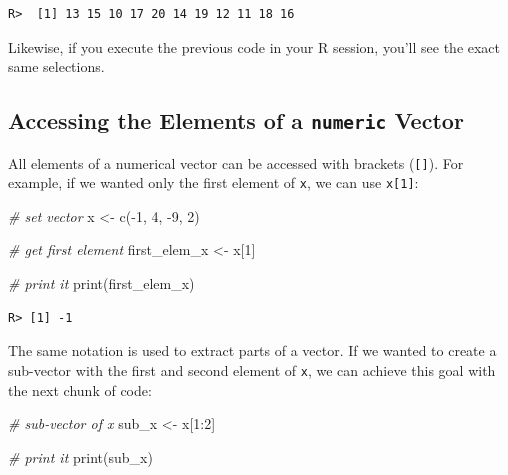 \documentclass[
  12pt,
]{book}
\newenvironment{Shaded}{\begin{snugshade}}{\end{snugshade}}
\newcommand{\CommentTok}[1]{\textcolor[rgb]{0.37,0.37,0.37}{\textit{#1}}}
\newcommand{\DecValTok}[1]{\textcolor[rgb]{0.06,0.06,0.06}{#1}}
\newcommand{\FunctionTok}[1]{\textcolor[rgb]{0,0,0}{#1}}
\newcommand{\NormalTok}[1]{#1}
\newcommand{\OtherTok}[1]{\textcolor[rgb]{0.37,0.37,0.37}{#1}}
\newcommand{\SpecialCharTok}[1]{\textcolor[rgb]{0,0,0}{#1}}
\begin{document}
\begin{verbatim}
R>  [1] 13 15 10 17 20 14 19 12 11 18 16
\end{verbatim}

Likewise, if you execute the previous code in your R session, you'll see the exact same selections.

\hypertarget{accessing-the-elements-of-a-numeric-vector}{%
\subsection{\texorpdfstring{Accessing the Elements of a \texttt{numeric} Vector}{Accessing the Elements of a numeric Vector}}\label{accessing-the-elements-of-a-numeric-vector}}

All elements of a numerical vector can be accessed with brackets (\texttt{{[}{]}}). For example, if we wanted only the first element of \texttt{x}, we can use \texttt{x{[}1{]}}:

\begin{Shaded}
\begin{Highlighting}[]
\CommentTok{\# set vector}
\NormalTok{x }\OtherTok{\textless{}{-}} \FunctionTok{c}\NormalTok{(}\SpecialCharTok{{-}}\DecValTok{1}\NormalTok{, }\DecValTok{4}\NormalTok{, }\SpecialCharTok{{-}}\DecValTok{9}\NormalTok{, }\DecValTok{2}\NormalTok{)}

\CommentTok{\# get first element}
\NormalTok{first\_elem\_x }\OtherTok{\textless{}{-}}\NormalTok{ x[}\DecValTok{1}\NormalTok{]}

\CommentTok{\# print it}
\FunctionTok{print}\NormalTok{(first\_elem\_x)}
\end{Highlighting}
\end{Shaded}

\begin{verbatim}
R> [1] -1
\end{verbatim}

The same notation is used to extract parts of a vector. If we wanted to create a sub-vector with the first and second element of \texttt{x}, we can achieve this goal with the next chunk of code:

\begin{Shaded}
\begin{Highlighting}[]
\CommentTok{\# sub{-}vector of x}
\NormalTok{sub\_x }\OtherTok{\textless{}{-}}\NormalTok{ x[}\DecValTok{1}\SpecialCharTok{:}\DecValTok{2}\NormalTok{]}

\CommentTok{\# print it}
\FunctionTok{print}\NormalTok{(sub\_x)}
\end{Highlighting}
\end{Shaded}
\end{document}
